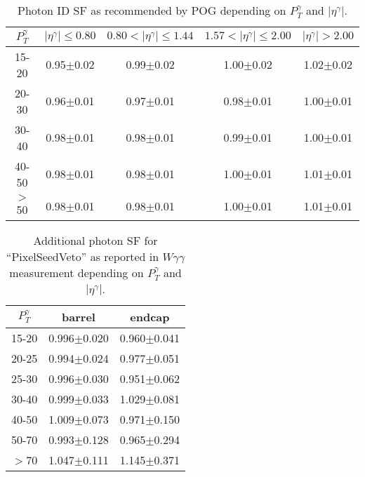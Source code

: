 \begin{table}[h]
  \footnotesize
  \begin{center}
  \caption{Photon ID SF as recommended by POG depending on $P_T^{\gamma}$ and $|\eta^{\gamma}|$.} 
   \begin{tabular}{|c|c|c|c|c|}
\hline
 $P_T^{\gamma}$  & $|\eta^{\gamma}|\leq 0.80$ & $0.80<|\eta^{\gamma}|\leq 1.44$ & $1.57<|\eta^{\gamma}|\leq 2.00$ & $|\eta^{\gamma}|> 2.00$\\ \hline
15-20          & 0.95$\pm$0.02   & 0.99$\pm$0.02        & 1.00$\pm$0.02        & 1.02$\pm$0.02 \\ \hline
20-30          & 0.96$\pm$0.01   & 0.97$\pm$0.01        & 0.98$\pm$0.01        & 1.00$\pm$0.01 \\ \hline
30-40          & 0.98$\pm$0.01   & 0.98$\pm$0.01        & 0.99$\pm$0.01        & 1.00$\pm$0.01 \\ \hline
40-50          & 0.98$\pm$0.01   & 0.98$\pm$0.01        & 1.00$\pm$0.01        & 1.01$\pm$0.01 \\ \hline
$>$50          & 0.98$\pm$0.01   & 0.98$\pm$0.01        & 1.00$\pm$0.01        & 1.01$\pm$0.01 \\ \hline
  \end{tabular}
  \label{tab:SFs_PhotonID}
  \end{center}
\end{table}

\begin{table}[h]
  \footnotesize
  \begin{center}
  \caption{Additional photon SF for ``PixelSeedVeto'' as reported in $W\gamma\gamma$ measurement depending on $P_T^{\gamma}$ and $|\eta^{\gamma}|$.} 
   \begin{tabular}{|c|c|c|}
\hline
 $P_T^{\gamma}$  & barrel              & endcap \\ \hline
15-20          & 0.996$\pm$0.020     & 0.960$\pm$0.041 \\ \hline
20-25          & 0.994$\pm$0.024     & 0.977$\pm$0.051 \\ \hline
25-30          & 0.996$\pm$0.030     & 0.951$\pm$0.062 \\ \hline
30-40          & 0.999$\pm$0.033     & 1.029$\pm$0.081 \\ \hline
40-50          & 1.009$\pm$0.073     & 0.971$\pm$0.150 \\ \hline
50-70          & 0.993$\pm$0.128     & 0.965$\pm$0.294 \\ \hline
$>$70          & 1.047$\pm$0.111     & 1.145$\pm$0.371 \\ \hline

  \end{tabular}
  \label{tab:SFs_PhotonPixelSeedVeto}
  \end{center}
\end{table}

